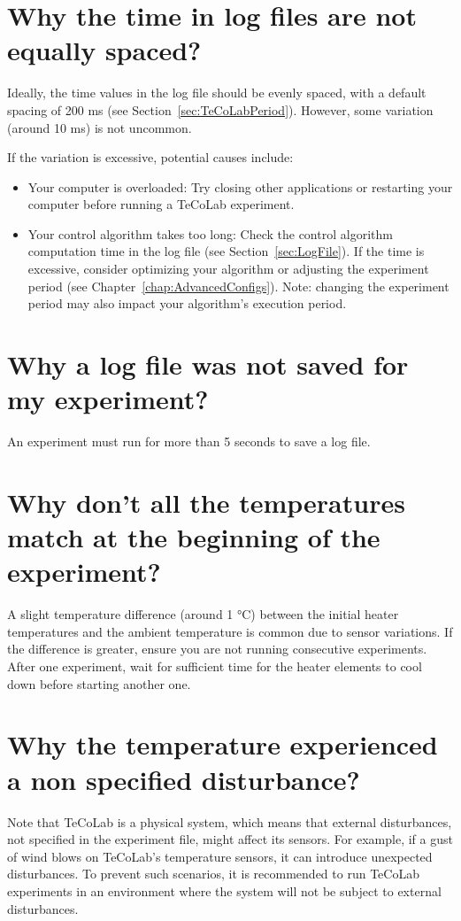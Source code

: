 \documentclass[12pt]{report}
\begin{document}
\section{Why the time in log files are not equally spaced?}

Ideally, the time values in the log file should be evenly spaced, with a default spacing of 200 ms (see Section~\ref{sec:TeCoLabPeriod}). However, some variation (around 10 ms) is not uncommon.

If the variation is excessive, potential causes include:
\begin{itemize}
\item Your computer is overloaded: Try closing other applications or restarting your computer before running a TeCoLab experiment.
\item Your control algorithm takes too long: Check the control algorithm computation time in the log file (see Section~\ref{sec:LogFile}). If the time is excessive, consider optimizing your algorithm or adjusting the experiment period (see Chapter~\ref{chap:AdvancedConfigs}). Note: changing the experiment period may also impact your algorithm's execution period.
\end{itemize}

\section{Why a log file was not saved for my experiment?}

An experiment must run for more than 5 seconds to save a log file.

\section{Why don't all the temperatures match at the beginning of the experiment?}

A slight temperature difference (around 1 °C) between the initial heater temperatures and the ambient temperature is common due to sensor variations. If the difference is greater, ensure you are not running consecutive experiments. After one experiment, wait for sufficient time for the heater elements to cool down before starting another one.

\section{Why the temperature experienced a non specified disturbance?}

Note that TeCoLab is a physical system, which means that external disturbances, not specified in the experiment file, might affect its sensors. For example, if a gust of wind blows on TeCoLab's temperature sensors, it can introduce unexpected disturbances. To prevent such scenarios, it is recommended to run TeCoLab experiments in an environment where the system will not be subject to external disturbances.
\end{document}

